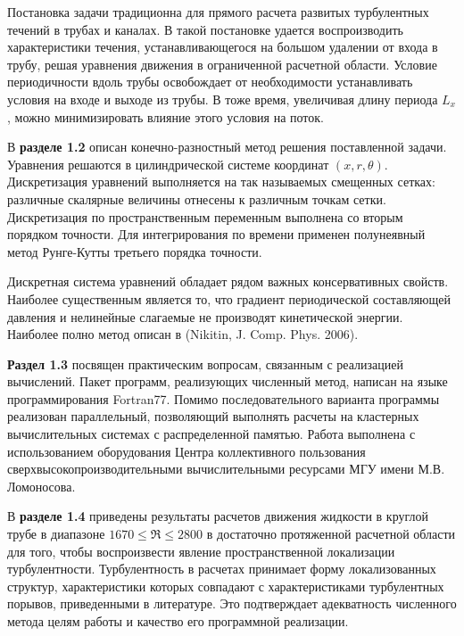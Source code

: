 Постановка задачи традиционна для прямого расчета развитых турбулентных течений в трубах и каналах. В такой постановке удается воспроизводить характеристики течения, устанавливающегося на большом удалении от входа в трубу, решая уравнения движения в ограниченной расчетной области. Условие периодичности вдоль трубы освобождает от необходимости устанавливать условия на входе и выходе из трубы. В тоже время, увеличивая длину периода $L_x$, можно минимизировать влияние этого условия на поток.

В \textbf{разделе 1.2} описан конечно-разностный метод решения поставленной задачи. Уравнения решаются в цилиндрической системе координат $(x,r,\theta)$. Дискретизация уравнений выполняется на так называемых смещенных сетках: различные скалярные величины отнесены к различным точкам сетки. 
Дискретизация по пространственным переменным выполнена со вторым порядком точности. Для интегрирования по времени применен полунеявный метод Рунге-Кутты третьего порядка точности. 

Дискретная система уравнений обладает рядом важных консервативных свойств. Наиболее существенным является то, что градиент периодической составляющей давления и нелинейные слагаемые не производят кинетической энергии. Наиболее полно метод описан в (Nikitin, J. Comp. Phys. 2006).

\textbf{Раздел 1.3} посвящен практическим вопросам, связанным с реализацией вычислений. Пакет программ, реализующих численный метод, написан на языке программирования Fortran77. Помимо последовательного варианта программы реализован параллельный, позволяющий выполнять расчеты на кластерных вычислительных системах с распределенной памятью. Работа выполнена с использованием оборудования Центра коллективного пользования сверхвысокопроизводительными вычислительными ресурсами МГУ имени М.В.\,Ломоносова. 

В \textbf{разделе 1.4} приведены результаты расчетов движения жидкости в круглой трубе в диапазоне $1670 \leqslant \Re \leqslant 2800$ в достаточно протяженной расчетной области для того, чтобы воспроизвести явление пространственной локализации турбулентности. Турбулентность в расчетах принимает форму локализованных структур, характеристики которых совпадают с характеристиками турбулентных порывов, приведенными в литературе. Это подтверждает адекватность численного метода целям работы и качество его программной реализации. 

